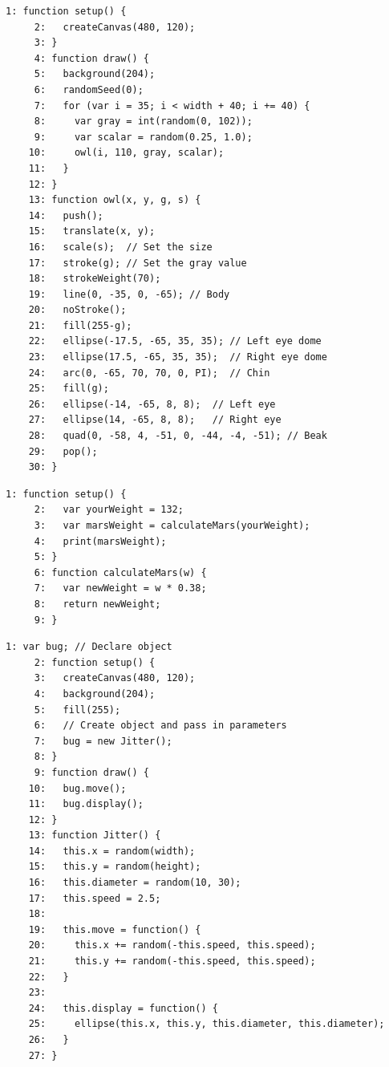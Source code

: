 \documentclass[a4j]{ltjsarticle}
\begin{document}
\vspace{1in}
\begin{lstlisting}[caption=Ex\_09\_07.js]
     1: function setup() {
     2:   createCanvas(480, 120);
     3: }
     4: function draw() {
     5:   background(204);
     6:   randomSeed(0);
     7:   for (var i = 35; i < width + 40; i += 40) {
     8:     var gray = int(random(0, 102));
     9:     var scalar = random(0.25, 1.0);
    10:     owl(i, 110, gray, scalar);
    11:   }
    12: }
    13: function owl(x, y, g, s) {
    14:   push();
    15:   translate(x, y);
    16:   scale(s);  // Set the size
    17:   stroke(g); // Set the gray value
    18:   strokeWeight(70);
    19:   line(0, -35, 0, -65); // Body
    20:   noStroke();
    21:   fill(255-g);
    22:   ellipse(-17.5, -65, 35, 35); // Left eye dome
    23:   ellipse(17.5, -65, 35, 35);  // Right eye dome
    24:   arc(0, -65, 70, 70, 0, PI);  // Chin
    25:   fill(g);
    26:   ellipse(-14, -65, 8, 8);  // Left eye
    27:   ellipse(14, -65, 8, 8);   // Right eye
    28:   quad(0, -58, 4, -51, 0, -44, -4, -51); // Beak
    29:   pop();
    30: }
\end{lstlisting}
\vspace{1in}
\begin{lstlisting}[caption=Ex\_09\_08.js]
     1: function setup() {
     2:   var yourWeight = 132;
     3:   var marsWeight = calculateMars(yourWeight);
     4:   print(marsWeight);
     5: }
     6: function calculateMars(w) {
     7:   var newWeight = w * 0.38;
     8:   return newWeight;
     9: }
\end{lstlisting}
\vspace{1in}
\begin{lstlisting}[caption=Ex\_10\_01.js]
     1: var bug; // Declare object
     2: function setup() {
     3:   createCanvas(480, 120);
     4:   background(204);
     5:   fill(255);
     6:   // Create object and pass in parameters
     7:   bug = new Jitter();
     8: }
     9: function draw() {
    10:   bug.move();
    11:   bug.display();
    12: }
    13: function Jitter() {
    14:   this.x = random(width);
    15:   this.y = random(height);
    16:   this.diameter = random(10, 30);
    17:   this.speed = 2.5;
    18:   
    19:   this.move = function() {
    20:     this.x += random(-this.speed, this.speed);
    21:     this.y += random(-this.speed, this.speed);
    22:   }
    23:   
    24:   this.display = function() {
    25:     ellipse(this.x, this.y, this.diameter, this.diameter);
    26:   }
    27: }
\end{lstlisting}
\end{document}
